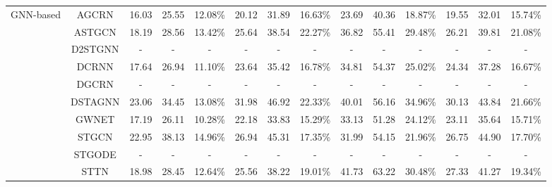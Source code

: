 \begin{table}[t]
{\begin{tabular}{c|c|c|c|c|c|c|c|c|c|c|c|c|c}
\midrule
\multirow{10}{*}{GNN-based} & AGCRN & 16.03 & 25.55 & 12.08\% & 20.12 & 31.89 & 16.63\% & 23.69 & 40.36 & 18.87\% & 19.55 & 32.01 & 15.74\% \\
 & ASTGCN & 18.19 & 28.56 & 13.42\% & 25.64 & 38.54 & 22.27\% & 36.82 & 55.41 & 29.48\% & 26.21 & 39.81 & 21.08\% \\
 & D2STGNN & - & - & - & - & - & - & - & - & - & - & - & - \\
 & DCRNN & 17.64 & 26.94 & 11.10\% & 23.64 & 35.42 & 16.78\% & 34.81 & 54.37 & 25.02\% & 24.34 & 37.28 & 16.67\% \\
 & DGCRN & - & - & - & - & - & - & - & - & - & - & - & - \\
 & DSTAGNN & 23.06 & 34.45 & 13.08\% & 31.98 & 46.92 & 22.33\% & 40.01 & 56.16 & 34.96\% & 30.13 & 43.84 & 21.66\% \\
 & GWNET & 17.19 & 26.11 & 10.28\% & 22.18 & 33.83 & 15.29\% & 33.13 & 51.28 & 24.12\% & 23.11 & 35.64 & 15.71\% \\
 & STGCN & 22.95 & 38.13 & 14.96\% & 26.94 & 45.31 & 17.35\% & 31.99 & 54.15 & 21.96\% & 26.75 & 44.90 & 17.70\% \\
 & STGODE & - & - & - & - & - & - & - & - & - & - & - & - \\
 & STTN & 18.98 & 28.45 & 12.64\% & 25.56 & 38.22 & 19.01\% & 41.73 & 63.22 & 30.48\% & 27.33 & 41.27 & 19.34\% \\
\bottomrule
\end{tabular}
}
\end{table}

